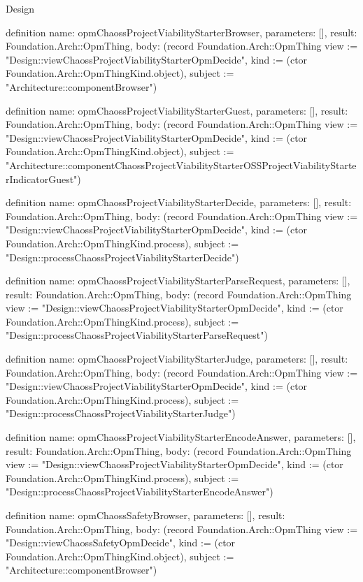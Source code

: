 \begin{lexlean}{Design}
\begin{semanticmodule}
definition{
  name: opmChaossProjectViabilityStarterBrowser,
  parameters: [],
  result: Foundation.Arch::OpmThing,
  body: (record Foundation.Arch::OpmThing {view := "Design::viewChaossProjectViabilityStarterOpmDecide", kind := (ctor Foundation.Arch::OpmThingKind.object), subject := "Architecture::componentBrowser"})
}

definition{
  name: opmChaossProjectViabilityStarterGuest,
  parameters: [],
  result: Foundation.Arch::OpmThing,
  body: (record Foundation.Arch::OpmThing {view := "Design::viewChaossProjectViabilityStarterOpmDecide", kind := (ctor Foundation.Arch::OpmThingKind.object), subject := "Architecture::componentChaossProjectViabilityStarterOSSProjectViabilityStarterIndicatorGuest"})
}

definition{
  name: opmChaossProjectViabilityStarterDecide,
  parameters: [],
  result: Foundation.Arch::OpmThing,
  body: (record Foundation.Arch::OpmThing {view := "Design::viewChaossProjectViabilityStarterOpmDecide", kind := (ctor Foundation.Arch::OpmThingKind.process), subject := "Design::processChaossProjectViabilityStarterDecide"})
}

definition{
  name: opmChaossProjectViabilityStarterParseRequest,
  parameters: [],
  result: Foundation.Arch::OpmThing,
  body: (record Foundation.Arch::OpmThing {view := "Design::viewChaossProjectViabilityStarterOpmDecide", kind := (ctor Foundation.Arch::OpmThingKind.process), subject := "Design::processChaossProjectViabilityStarterParseRequest"})
}

definition{
  name: opmChaossProjectViabilityStarterJudge,
  parameters: [],
  result: Foundation.Arch::OpmThing,
  body: (record Foundation.Arch::OpmThing {view := "Design::viewChaossProjectViabilityStarterOpmDecide", kind := (ctor Foundation.Arch::OpmThingKind.process), subject := "Design::processChaossProjectViabilityStarterJudge"})
}

definition{
  name: opmChaossProjectViabilityStarterEncodeAnswer,
  parameters: [],
  result: Foundation.Arch::OpmThing,
  body: (record Foundation.Arch::OpmThing {view := "Design::viewChaossProjectViabilityStarterOpmDecide", kind := (ctor Foundation.Arch::OpmThingKind.process), subject := "Design::processChaossProjectViabilityStarterEncodeAnswer"})
}

definition{
  name: opmChaossSafetyBrowser,
  parameters: [],
  result: Foundation.Arch::OpmThing,
  body: (record Foundation.Arch::OpmThing {view := "Design::viewChaossSafetyOpmDecide", kind := (ctor Foundation.Arch::OpmThingKind.object), subject := "Architecture::componentBrowser"})
}


\end{semanticmodule}
\end{lexlean}
